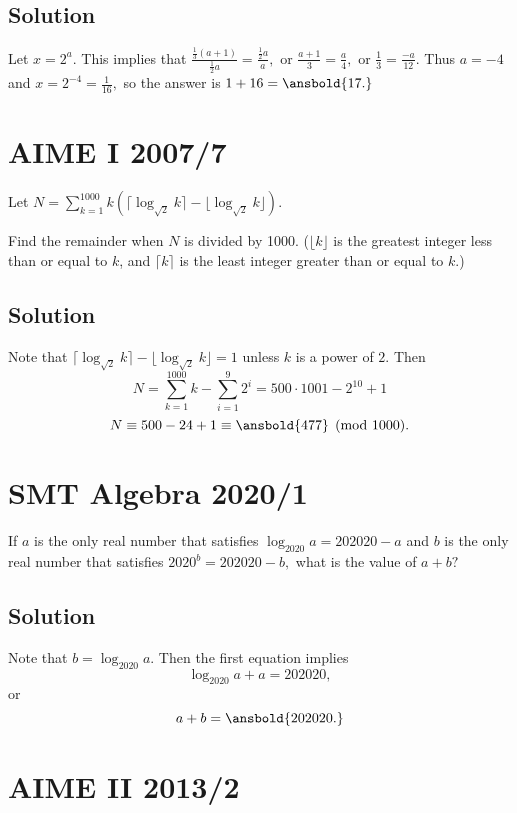 \documentclass[mast]{lucky}
\begin{document}
\subsection{Solution}

Let $x=2^a.$ This implies that $\frac{\frac{1}{3}(a+1)}{\frac{1}{2}a}=\frac{\frac{1}{2}a}{a},$ or $\frac{a+1}{3}=\frac{a}{4},$ or $\frac{1}{3}=\frac{-a}{12}.$ Thus $a=-4$ and $x=2^{-4}=\frac{1}{16},$ so the answer is $1+16=\ansbold{17.}$

\pagebreak\section{AIME I 2007/7}

Let $N = \sum\limits_{k = 1}^{1000} k ( \lceil \log_{\sqrt{2}} k \rceil  - \lfloor \log_{\sqrt{2}} k \rfloor ).$

Find the remainder when $N$ is divided by 1000. ($\lfloor{k}\rfloor$ is the greatest integer less than or equal to $k$, and $\lceil{k}\rceil$ is the least integer greater than or equal to $k$.)

\subsection{Solution}

Note that $\lceil\log_{\sqrt{2}}k\rceil-\lfloor\log_{\sqrt{2}}k\rfloor=1$ unless $k$ is a power of $2.$ Then
    \[N=\sum\limits_{k=1}^{1000}k-\sum\limits_{i=1}^{9}2^i=500\cdot 1001-2^{10}+1\]
    \[N\equiv 500-24+1\equiv \ansbold{477}\pmod{1000}.\]

\pagebreak\section{SMT Algebra 2020/1}

If $a$ is the only real number that satisfies $\log_{2020}a=202020-a$ and $b$ is the only real number that satisfies $2020^b=202020-b,$ what is the value of $a+b?$

\subsection{Solution}

Note that $b=\log_{2020}a.$ Then the first equation implies
    \[\log_{2020}a+a=202020,\] or
    \[a+b=\ansbold{202020.}\]

\pagebreak\section{AIME II 2013/2}
\end{document}
